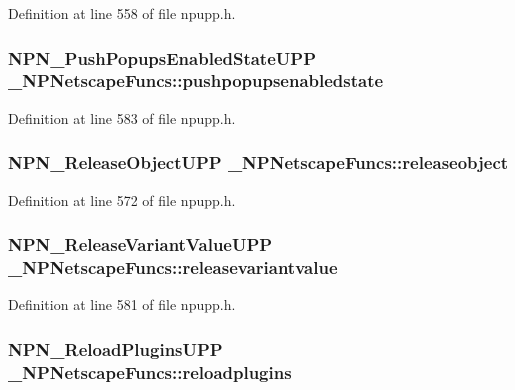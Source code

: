 Definition at line 558 of file npupp.h.

\hypertarget{struct___n_p_netscape_funcs_af3a5dd5183774fce6b81d0cb0503517b}{
\subsubsection[{pushpopupsenabledstate}]{\setlength{\rightskip}{0pt plus 5cm}NPN\_\-PushPopupsEnabledStateUPP {\bf \_\-NPNetscapeFuncs::pushpopupsenabledstate}}}
\label{struct___n_p_netscape_funcs_af3a5dd5183774fce6b81d0cb0503517b}


Definition at line 583 of file npupp.h.

\hypertarget{struct___n_p_netscape_funcs_a54de30bc5da955596a5d9b7e906ec379}{
\subsubsection[{releaseobject}]{\setlength{\rightskip}{0pt plus 5cm}NPN\_\-ReleaseObjectUPP {\bf \_\-NPNetscapeFuncs::releaseobject}}}
\label{struct___n_p_netscape_funcs_a54de30bc5da955596a5d9b7e906ec379}


Definition at line 572 of file npupp.h.

\hypertarget{struct___n_p_netscape_funcs_a50af16220fecfff27b2ddeefd48d9637}{
\subsubsection[{releasevariantvalue}]{\setlength{\rightskip}{0pt plus 5cm}NPN\_\-ReleaseVariantValueUPP {\bf \_\-NPNetscapeFuncs::releasevariantvalue}}}
\label{struct___n_p_netscape_funcs_a50af16220fecfff27b2ddeefd48d9637}


Definition at line 581 of file npupp.h.

\hypertarget{struct___n_p_netscape_funcs_aa85340e417d93dfcc7708bbcfa3d9c12}{
\subsubsection[{reloadplugins}]{\setlength{\rightskip}{0pt plus 5cm}NPN\_\-ReloadPluginsUPP {\bf \_\-NPNetscapeFuncs::reloadplugins}}}
\label{struct___n_p_netscape_funcs_aa85340e417d93dfcc7708bbcfa3d9c12}


